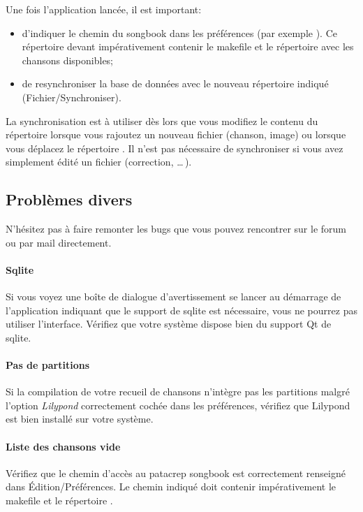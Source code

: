 \documentclass[versionenligne]{framabook}
\begin{document}
Une fois l'application lancée, il est important:
\begin{itemize}
\item d'indiquer le chemin du songbook dans les préférences (par
  exemple ). Ce répertoire devant impérativement
  contenir le makefile et le répertoire  avec les chansons
  disponibles;
\item de resynchroniser la base de données avec le nouveau répertoire
  indiqué (Fichier/Synchroniser).
\end{itemize}

\begin{nota}
  La synchronisation est à utiliser dès lors que vous modifiez le
  contenu du répertoire  lorsque vous rajoutez un nouveau
  fichier (chanson, image) ou lorsque vous déplacez le répertoire
  .  Il n'est pas nécessaire de synchroniser si vous
  avez simplement édité un fichier (correction, \dots\,).
\end{nota}

\subsection{Problèmes divers}

N'hésitez pas à faire remonter les bugs que vous pouvez rencontrer sur
le forum ou par mail directement. 

\paragraph{Sqlite} Si vous voyez une boîte de dialogue
d'avertissement se lancer au démarrage de l'application indiquant que
le support de sqlite est nécessaire, vous ne pourrez pas utiliser
l'interface. Vérifiez que votre système dispose bien du support Qt de sqlite.

\paragraph{Pas de partitions}
Si la compilation de votre recueil de chansons n'intègre pas les
partitions malgré l'option \emph{Lilypond} correctement cochée dans les
préférences, vérifiez que Lilypond est bien installé sur votre système. 

\paragraph{Liste des chansons vide} Vérifiez que le chemin d'accès au
patacrep songbook est correctement renseigné dans Édition/Préférences.
Le chemin indiqué doit contenir impérativement le makefile et le
répertoire .
\end{document}
